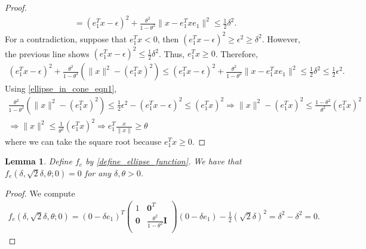 \documentclass{article}
\newtheorem{lemma}[theorem]{Lemma}
\theoremstyle{case}
\numberwithin{theorem}{subsection}
\begin{document}
\begin{proof}
\begin{align*}
=
(e_1^Tx - \epsilon)^2 + \frac{\theta^2}{1 - \theta^2}\|x - e_1^Tx e_1\|^2 \le \frac 1 2 \delta^2.
\end{align*}
For a contradiction, suppose that $e_1^Tx < 0$, then $(e_1^Tx - \epsilon)^2 \ge \epsilon^2 \ge \delta^2$.
However, the previous line shows $(e_1^Tx - \epsilon)^2 \le \frac 1 2 \delta^2$.
Thus, $e_1^Tx \ge 0$.
Therefore,
\begin{align*}
(e_1^Tx - \epsilon)^2 + \frac{\theta^2}{1 - \theta^2}\left(\|x\|^2 - (e_1^Tx)^2\right) 
\le (e_1^Tx - \epsilon)^2 + \frac{\theta^2}{1 - \theta^2}\|x - e_1^Tx e_1\|^2 \le \frac 1 2 \delta^2 \le \frac 1 2 \epsilon^2.
\end{align*}
Using \cref{ellipse_in_cone_eqn1}, 
\begin{align*}
\frac{\theta^2}{1 - \theta^2}(\|x\|^2 - (e_1^Tx)^2) \le \frac 1 2 \epsilon^2 - (e_1^Tx - \epsilon)^2 \le (e_1^Tx)^2
\Longrightarrow \|x\|^2 - (e_1^Tx)^2 \le \frac{1 - \theta^2}{\theta^2}(e_1^Tx)^2 \\
\Longrightarrow \|x\|^2 \le \frac 1 {\theta^2}(e_1^Tx)^2
\Longrightarrow e_1^T\frac{x}{\|x\|} \ge \theta
\end{align*}
where we can take the square root because $e_1^Tx \ge 0$.
\end{proof}

\begin{lemma}
\label{ellipse_fits}
Define $f_e$ by \cref{define_ellipse_function}.
We have that $f_e(\delta, \sqrt{2}\delta, \theta; 0) = 0$ for any $\delta, \theta > 0$.
\end{lemma}
\begin{proof}
We compute
\begin{align*}
f_e(\delta, \sqrt{2}\delta, \theta; 0) =(0 - \delta e_1)^T\begin{pmatrix}
1 & \boldsymbol0^T \\
\boldsymbol 0 & \frac{\theta^2}{1 - \theta^2} \boldsymbol I \\
\end{pmatrix}(0 - \delta e_1) - \frac 1 2 (\sqrt 2 \delta)^2
=\delta^2 - \delta^2 = 0.
\end{align*}
\end{proof}
\end{document}
